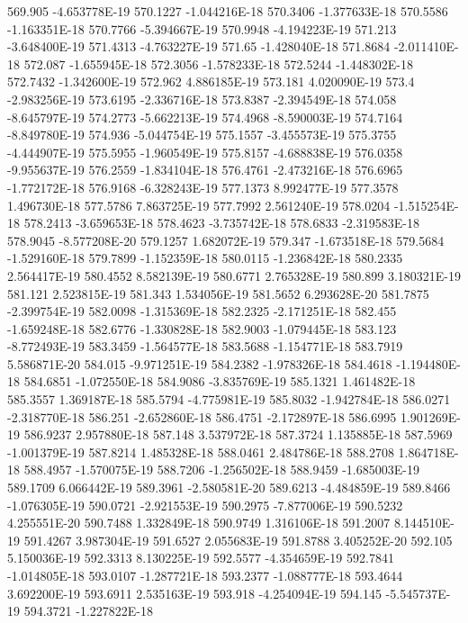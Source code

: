 569.905  -4.653778E-19
570.1227  -1.044216E-18
570.3406  -1.377633E-18
570.5586  -1.163351E-18
570.7766  -5.394667E-19
570.9948  -4.194223E-19
571.213  -3.648400E-19
571.4313  -4.763227E-19
571.65  -1.428040E-18
571.8684  -2.011410E-18
572.087  -1.655945E-18
572.3056  -1.578233E-18
572.5244  -1.448302E-18
572.7432  -1.342600E-19
572.962  4.886185E-19
573.181  4.020090E-19
573.4  -2.983256E-19
573.6195  -2.336716E-18
573.8387  -2.394549E-18
574.058  -8.645797E-19
574.2773  -5.662213E-19
574.4968  -8.590003E-19
574.7164  -8.849780E-19
574.936  -5.044754E-19
575.1557  -3.455573E-19
575.3755  -4.444907E-19
575.5955  -1.960549E-19
575.8157  -4.688838E-19
576.0358  -9.955637E-19
576.2559  -1.834104E-18
576.4761  -2.473216E-18
576.6965  -1.772172E-18
576.9168  -6.328243E-19
577.1373  8.992477E-19
577.3578  1.496730E-18
577.5786  7.863725E-19
577.7992  2.561240E-19
578.0204  -1.515254E-18
578.2413  -3.659653E-18
578.4623  -3.735742E-18
578.6833  -2.319583E-18
578.9045  -8.577208E-20
579.1257  1.682072E-19
579.347  -1.673518E-18
579.5684  -1.529160E-18
579.7899  -1.152359E-18
580.0115  -1.236842E-18
580.2335  2.564417E-19
580.4552  8.582139E-19
580.6771  2.765328E-19
580.899  3.180321E-19
581.121  2.523815E-19
581.343  1.534056E-19
581.5652  6.293628E-20
581.7875  -2.399754E-19
582.0098  -1.315369E-18
582.2325  -2.171251E-18
582.455  -1.659248E-18
582.6776  -1.330828E-18
582.9003  -1.079445E-18
583.123  -8.772493E-19
583.3459  -1.564577E-18
583.5688  -1.154771E-18
583.7919  5.586871E-20
584.015  -9.971251E-19
584.2382  -1.978326E-18
584.4618  -1.194480E-18
584.6851  -1.072550E-18
584.9086  -3.835769E-19
585.1321  1.461482E-18
585.3557  1.369187E-18
585.5794  -4.775981E-19
585.8032  -1.942784E-18
586.0271  -2.318770E-18
586.251  -2.652860E-18
586.4751  -2.172897E-18
586.6995  1.901269E-19
586.9237  2.957880E-18
587.148  3.537972E-18
587.3724  1.135885E-18
587.5969  -1.001379E-19
587.8214  1.485328E-18
588.0461  2.484786E-18
588.2708  1.864718E-18
588.4957  -1.570075E-19
588.7206  -1.256502E-18
588.9459  -1.685003E-19
589.1709  6.066442E-19
589.3961  -2.580581E-20
589.6213  -4.484859E-19
589.8466  -1.076305E-19
590.0721  -2.921553E-19
590.2975  -7.877006E-19
590.5232  4.255551E-20
590.7488  1.332849E-18
590.9749  1.316106E-18
591.2007  8.144510E-19
591.4267  3.987304E-19
591.6527  2.055683E-19
591.8788  3.405252E-20
592.105  5.150036E-19
592.3313  8.130225E-19
592.5577  -4.354659E-19
592.7841  -1.014805E-18
593.0107  -1.287721E-18
593.2377  -1.088777E-18
593.4644  3.692200E-19
593.6911  2.535163E-19
593.918  -4.254094E-19
594.145  -5.545737E-19
594.3721  -1.227822E-18
